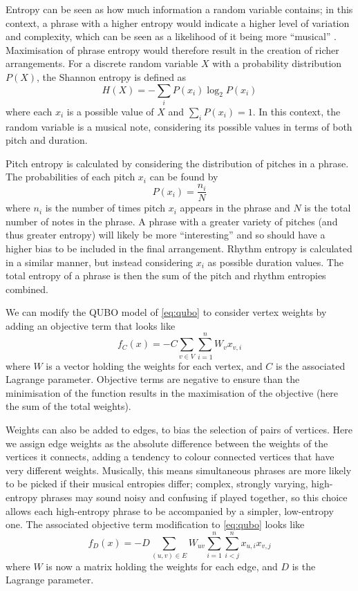 \documentclass[12pt]{article}
\theoremstyle{definition}
\begin{document}
Entropy can be seen as how much information a random variable contains; in this context, a phrase with a higher entropy would indicate a higher level of variation and complexity, which can be seen as a likelihood of it being more ``musical'' \cite{li_entropy_2019}. Maximisation of phrase entropy would therefore result in the creation of richer arrangements. For a discrete random variable $X$ with a probability distribution $P(X)$, the Shannon entropy is defined as
\begin{equation}
    H(X)=-\sum_i P(x_i)\log_2 P(x_i)
    \label{eq:entropy}
\end{equation}
where each $x_i$ is a possible value of $X$ and ${\sum_i P(x_i)=1}$. In this context, the random variable is a musical note, considering its possible values in terms of both pitch and duration.

Pitch entropy is calculated by considering the distribution of pitches in a phrase. The probabilities of each pitch $x_i$ can be found by
\begin{equation}
    P(x_i)=\frac{n_i}{N}
    \label{eq:prob-dist}
\end{equation}
where $n_i$ is the number of times pitch $x_i$ appears in the phrase and $N$ is the total number of notes in the phrase. A phrase with a greater variety of pitches (and thus greater entropy) will likely be more ``interesting'' and so should have a higher bias to be included in the final arrangement.
Rhythm entropy is calculated in a similar manner, but instead considering $x_i$ as possible duration values.
The total entropy of a phrase is then the sum of the pitch and rhythm entropies combined.

We can modify the QUBO model of \cref{eq:qubo} to consider vertex weights by adding an objective term that looks like
\begin{equation}
    f_C(x)=-C\sum_{v\in V}\sum_{i=1}^n W_v x_{v,i}
\end{equation}
where $W$ is a vector holding the weights for each vertex, and $C$ is the associated Lagrange parameter. Objective terms are negative to ensure than the minimisation of the function results in the maximisation of the objective (here the sum of the total weights).

Weights can also be added to edges, to bias the selection of pairs of vertices. Here we assign edge weights as the absolute difference between the weights of the vertices it connects, adding a tendency to colour connected vertices that have very different weights. Musically, this means simultaneous phrases are more likely to be picked if their musical entropies differ; complex, strongly varying, high-entropy phrases may sound noisy and confusing if played together, so this choice allows each high-entropy phrase to be accompanied by a simpler, low-entropy one. The associated objective term modification to \cref{eq:qubo} looks like
\begin{equation}
    f_D(x)=-D\sum_{(u,v)\in E}W_{uv}\sum_{i=1}^n\sum_{i<j}^n x_{u,i}x_{v,j}
\end{equation}
where $W$ is now a matrix holding the weights for each edge, and $D$ is the Lagrange parameter.
\end{document}
